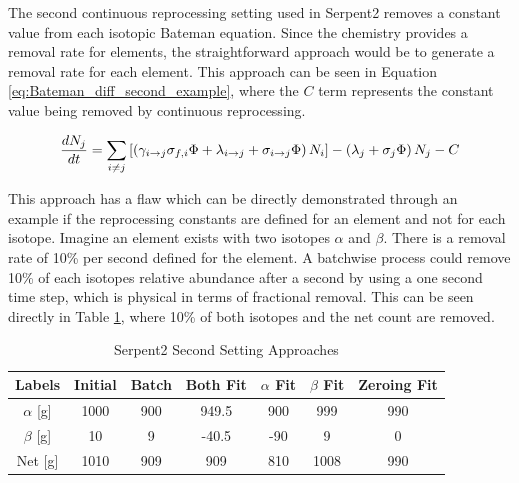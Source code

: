 The second continuous reprocessing setting used in Serpent2 removes a constant value from each isotopic Bateman equation. Since the chemistry provides a removal rate for elements, the straightforward approach would be to generate a removal rate for each element. This approach can be seen in Equation \ref{eq:Bateman_diff_second_example}, where the $C$ term represents the constant value being removed by continuous reprocessing.

\begin{equation} \hfill
\frac{dN_j}{dt} = \sum_{i \neq j} \left [ \left( \gamma_{i \rightarrow j} \sigma_{f, i} \Phi + \lambda _{i \rightarrow j} + \sigma_{i \rightarrow j} \Phi \right) N_i \right ] - \left ( \lambda_j + \sigma_j \Phi \right ) N_j - C
\hfill\label{eq:Bateman_diff_second_example} \end{equation}

This approach has a flaw which can be directly demonstrated through an example if the reprocessing constants are defined for an element and not for each isotope. Imagine an element exists with two isotopes $\alpha$ and $\beta$. There is a removal rate of 10\% per second defined for the element. A batchwise process could remove 10\% of each isotopes relative abundance after a second by using a one second time step, which is physical in terms of fractional removal. This can be seen directly in Table \ref{tab:cont_repr_appr}, where 10\% of both isotopes and the net count are removed.

\begin{table}[ht]
\renewcommand{\arraystretch}{1.25}
\caption{Serpent2 Second Setting Approaches}
\label{tab:cont_repr_appr}
\begin{center}
\begin{tabular}{ | c | c | c | c | c | c | c |}
 \hline
 Labels & Initial & Batch & Both Fit & $\alpha$ Fit & $\beta$ Fit & Zeroing Fit\\
 \hline
 \hline
$\alpha$ [g] & 1000 & 900 & 949.5 & 900 & 999 & 990\\
$\beta$ [g] & 10 & 9 & -40.5 & -90 & 9 & 0\\
 \hline
 Net [g] & 1010 & 909 & 909 & 810 & 1008 & 990 \\
 \hline
\end{tabular}
\end{center}
\end{table}

